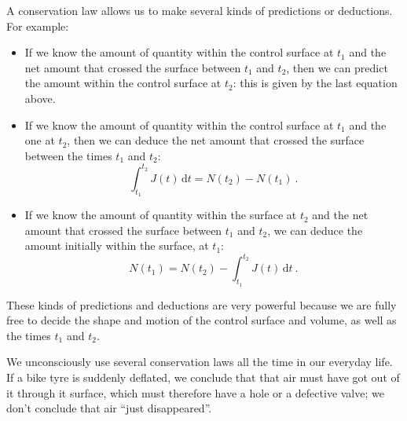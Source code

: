\documentclass[a4paper,12pt,%
onecolumn,oneside,titlepage,%
british%
]{memoir}
\newcommand*{\di}{\mathrm{d}}%
\renewcommand*{\|}[1][]{\nonscript\:#1\vert\nonscript\:\mathopen{}}
\newcommand*{\yN}{N}
\newcommand*{\yJ}{J}
\begin{document}
A conservation law allows us to make several kinds of predictions or deductions. For example:
\begin{itemize}
\item If we know the amount of quantity within the control surface at $t_{1}$ and the net amount that crossed the surface between $t_{1}$ and $t_{2}$, then we can predict the amount within the control surface at $t_{2}$: this is given by the last equation above.

\item If we know the amount of quantity within the control surface at $t_{1}$ and the one at $t_{2}$, then we can deduce the net amount that crossed the surface between the times $t_{1}$ and $t_{2}$:
  \begin{equation*}
    \int_{t_{1}}^{t_{2}}\!\!\yJ(t)\, \di t = \yN(t_{2}) - \yN(t_{1}) \ .
  \end{equation*}

\item If we know the amount of quantity within the surface at $t_{2}$ and the net amount that crossed the surface between $t_{1}$ and $t_{2}$, we can deduce the amount initially within the surface, at $t_{1}$:
  \begin{equation*}
    \yN(t_{1}) = \yN(t_{2}) - \int_{t_{1}}^{t_{2}}\!\!\yJ(t)\, \di t \ .
  \end{equation*}
\end{itemize}

These kinds of predictions and deductions are very powerful because we are fully free to decide the shape and motion of the control surface and volume, as well as the times $t_{1}$ and $t_{2}$.

We unconsciously use
several conservation laws all the time in our everyday life. If a bike tyre is suddenly deflated, we conclude that that air must have got out of it through it surface, which must therefore have a hole or a defective valve; we don't conclude that air \enquote{just disappeared}.

\end{document}
